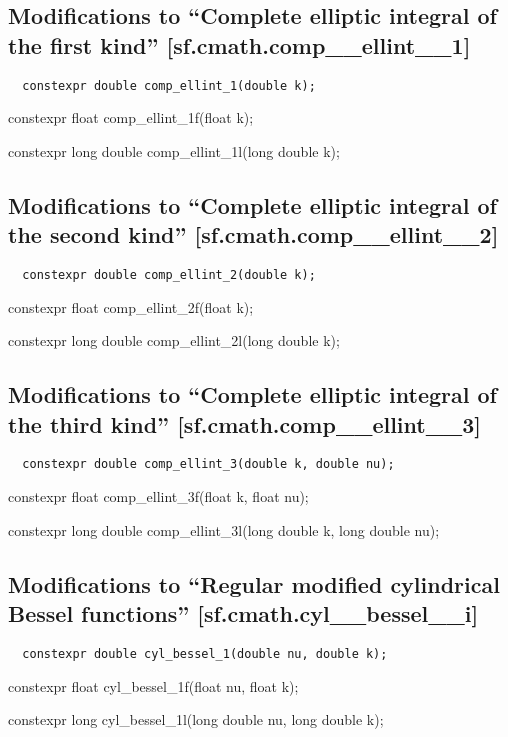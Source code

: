 \documentclass[prd,twocolumn,amsmath,amssymb,nofootinbib,eqsecnum]{revtex4-1}
\newcommand{\code}[1]{{\tt #1}}
\newcommand{\highlight}[1]{{\color{red} #1}}
\begin{document}
\subsection{Modifications to  ``Complete elliptic integral of the first kind''  [sf.cmath.comp\_\_ellint\_\_1]}

\code{
	\highlight{constexpr} double comp\_ellint\_1(double k);
	
	\highlight{constexpr} float comp\_ellint\_1f(float k);
	
	\highlight{constexpr} long double comp\_ellint\_1l(long double k);

}

\subsection{Modifications to  ``Complete elliptic integral of the second kind''  [sf.cmath.comp\_\_ellint\_\_2]}

\code{
	\highlight{constexpr} double comp\_ellint\_2(double k);
	
	\highlight{constexpr} float comp\_ellint\_2f(float k);
	
	\highlight{constexpr} long double comp\_ellint\_2l(long double k);

}

\subsection{Modifications to  ``Complete elliptic integral of the third kind''  [sf.cmath.comp\_\_ellint\_\_3]}

\code{
	\highlight{constexpr} double comp\_ellint\_3(double k, double nu);
	
	\highlight{constexpr} float comp\_ellint\_3f(float k, float nu);
	
	\highlight{constexpr} long double comp\_ellint\_3l(long double k, long double nu);

}

\subsection{Modifications to  ``Regular modified cylindrical Bessel functions''  [sf.cmath.cyl\_\_bessel\_\_i]}

\code{
	\highlight{constexpr} double cyl\_bessel\_1(double nu, double k);
	
	\highlight{constexpr} float cyl\_bessel\_1f(float nu, float k);
	
	\highlight{constexpr} long cyl\_bessel\_1l(long double nu, long double k);

}
\end{document}
